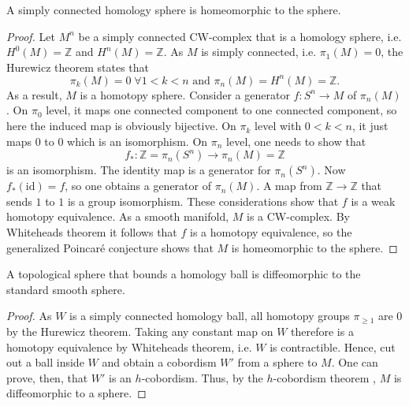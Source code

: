\begin{lemma}
    A simply connected homology sphere is homeomorphic to the sphere.
\end{lemma}
\begin{proof}
    Let $M^n$ be a simply connected CW-complex that is a homology sphere, i.e. $H^0(M) = \mathbb Z$ and $H^n(M) = \mathbb Z$. 
    As $M$ is simply connected, i.e. $\pi_1(M) = 0$, the Hurewicz theorem states that
    \[
    \pi_k(M) = 0 \; \forall 1 < k < n\text{ and }\pi_n(M) = H^n(M) = \mathbb Z.
    \]
    As a result, $M$ is a homotopy sphere.
    Consider a generator $f: S^n \to M$ of $\pi_n(M)$.
    On $\pi_0$ level, it maps one connected component to one connected component, so here the induced map is obviously bijective.
    On $\pi_k$ level with $0 < k < n$, it just maps $0$ to $0$ which is an isomorphism.
    On $\pi_n$ level, one needs to show that 
    \[
        f_*: \mathbb Z = \pi_n(S^n) \to \pi_n(M) = \mathbb Z 
    \]
    is an isomorphism. The identity map is a generator for $\pi_n(S^n)$. Now $f_*(\mathrm{id}) = f$, so one obtains a generator of $\pi_n(M)$. 
    A map from $\mathbb Z \to \mathbb Z$ that sends $1$ to $1$ is a group isomorphism. These considerations show that $f$ is a weak homotopy equivalence.
    As a smooth manifold, $M$ is a CW-complex. By Whiteheads theorem it follows that $f$ is a homotopy equivalence, so the generalized Poincar\'e conjecture 
    shows that $M$ is homeomorphic to the sphere.
\end{proof}

\begin{lemma}
    A topological sphere that bounds a homology ball is diffeomorphic to the standard smooth sphere.
\end{lemma}
\begin{proof}
    As $W$ is a simply connected homology ball, all homotopy groups $\pi_{\ge 1}$ are 0 by the Hurewicz theorem.
    Taking any constant map on $W$ therefore is a homotopy equivalence by Whiteheads theorem, i.e. $W$ is contractible. 
    Hence, cut out a ball inside $W$ and obtain a cobordism $W'$ from a sphere to $M$.
    One can prove, then, that $W'$ is an $h$-cobordism.
    Thus, by the $h$-cobordism theorem \cite[Theorem 1.9]{Ranicki02}, $M$ is diffeomorphic to a sphere.
\end{proof}